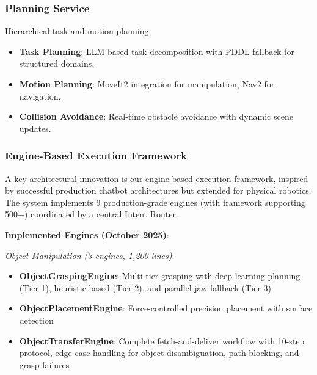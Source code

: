 \documentclass[conference]{IEEEtran}
\begin{document}
\subsubsection{Planning Service}

Hierarchical task and motion planning:

\begin{itemize}
    \item \textbf{Task Planning}: LLM-based task decomposition with PDDL fallback for structured domains.
    
    \item \textbf{Motion Planning}: MoveIt2 integration for manipulation, Nav2 for navigation.
    
    \item \textbf{Collision Avoidance}: Real-time obstacle avoidance with dynamic scene updates.
\end{itemize}

\subsubsection{Engine-Based Execution Framework}
\label{sec:engines}

A key architectural innovation is our engine-based execution framework, inspired by successful production chatbot architectures but extended for physical robotics. The system implements 9 production-grade engines (with framework supporting 500+) coordinated by a central Intent Router.

\textbf{Implemented Engines (October 2025)}:

\textit{Object Manipulation (3 engines, 1,200 lines)}:
\begin{itemize}
    \item \textbf{ObjectGraspingEngine}: Multi-tier grasping with deep learning planning (Tier 1), heuristic-based (Tier 2), and parallel jaw fallback (Tier 3)
    \item \textbf{ObjectPlacementEngine}: Force-controlled precision placement with surface detection
    \item \textbf{ObjectTransferEngine}: Complete fetch-and-deliver workflow with 10-step protocol, edge case handling for object disambiguation, path blocking, and grasp failures
\end{itemize}
\end{document}
